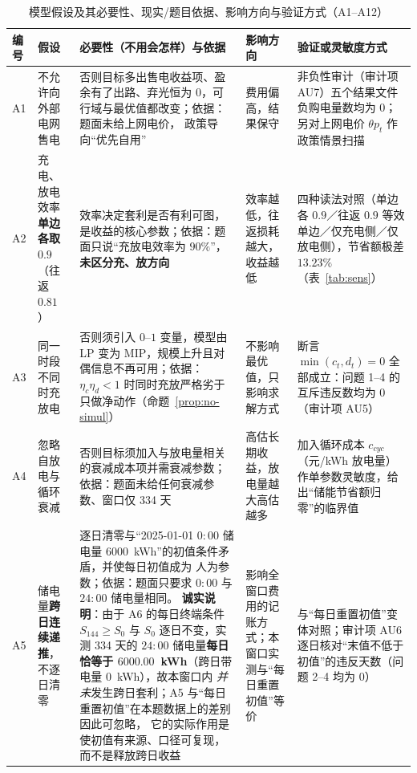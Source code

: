 \begin{table}[htbp]
  \centering
  \caption{模型假设及其必要性、现实/题目依据、影响方向与验证方式（A1--A12）}
  \label{tab:assumptions}
  \scriptsize
  \setlength{\tabcolsep}{3pt}
  \begin{tabularx}{\linewidth}{C{0.62cm} L{2.65cm} L{4.30cm} L{1.95cm} Y}
    \toprule
    编号 & 假设 & 必要性（不用会怎样）与依据 & 影响方向 & 验证或灵敏度方式 \\
    \midrule
    A1 & 不允许向外部电网售电
      & 否则目标多出售电收益项、盈余有了出路、弃光恒为 0，可行域与最优值都改变；依据：题面未给上网电价，
        政策导向“优先自用”
      & 费用偏高，结果保守
      & 非负性审计（审计项 AU7）五个结果文件负购电量数均为 0；另对上网电价 \(\theta p_t\) 作政策情景扫描 \\
    A2 & 充电、放电效率\textbf{单边各取} \(0.9\)（往返 \(0.81\)）
      & 效率决定套利是否有利可图，是收益的核心参数；依据：题面只说“充放电效率为 \(90\%\)”，
        \textbf{未区分充、放方向}
      & 效率越低，往返损耗越大，收益越低
      & 四种读法对照（单边各 \(0.9\)／往返 \(0.9\) 等效单边／仅充电侧／仅放电侧），节省额极差
        \(13.23\%\)（表~\ref{tab:sens}） \\
    A3 & 同一时段不同时充放电
      & 否则须引入 \(0\)--\(1\) 变量，模型由 LP 变为 MIP，规模上升且对偶信息不再可用；依据：
        \(\eta_c\eta_d<1\) 时同时充放严格劣于只做净动作（命题~\ref{prop:no-simul}）
      & 不影响最优值，只影响求解方式
      & 断言 \(\min(c_t,d_t)=0\) 全部成立：问题 1--4 的互斥违反数均为 0（审计项 AU5） \\
    A4 & 忽略自放电与循环衰减
      & 否则目标须加入与放电量相关的衰减成本项并需衰减参数；依据：题面未给任何衰减参数、窗口仅 334 天
      & 高估长期收益，放电量越大高估越多
      & 加入循环成本 \(c_{cyc}\)（元/kWh 放电量）作单参数灵敏度，给出“储能节省额归零”的临界值 \\
    A5 & 储电量\textbf{跨日连续递推}，不逐日清零
      & 逐日清零与“2025-01-01 \(0{:}00\) 储电量 \(6000\)~kWh”的初值条件矛盾，并使每日初值成为
        人为参数；依据：题面只要求 \(0{:}00\) 与 \(24{:}00\) 储电量相同。
        \textbf{诚实说明}：由于 A6 的每日终端条件 \(S_{144}\ge S_0\) 与 \(S_0\) 逐日不变，实测 334 天的
        \(24{:}00\) 储电量\textbf{每日恰等于 \(6000.00\)~kWh}（跨日带电量 \(0\)~kWh），故本窗口内
        \emph{并未}发生跨日套利；A5 与“每日重置初值”在本题数据上的差别因此可忽略，
        它的实际作用是使初值有来源、口径可复现，而不是释放跨日收益
      & 影响全窗口费用的记账方式；本窗口实测与“每日重置初值”等价
      & 与“每日重置初值”变体对照；审计项 AU6 逐日核对“末值不低于初值”的违反天数（问题 2--4 均为 0）

\end{tabularx}
\end{table}
